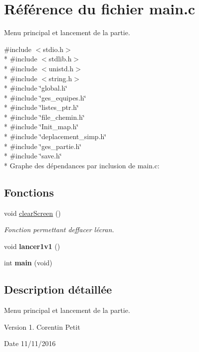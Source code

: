 \hypertarget{a00025}{}\section{Référence du fichier main.\+c}
\label{a00025}


Menu principal et lancement de la partie.  


{\ttfamily \#include $<$stdio.\+h$>$}\\*
{\ttfamily \#include $<$stdlib.\+h$>$}\\*
{\ttfamily \#include $<$unistd.\+h$>$}\\*
{\ttfamily \#include $<$string.\+h$>$}\\*
{\ttfamily \#include \char`\"{}global.\+h\char`\"{}}\\*
{\ttfamily \#include \char`\"{}ges\+\_\+equipes.\+h\char`\"{}}\\*
{\ttfamily \#include \char`\"{}listes\+\_\+ptr.\+h\char`\"{}}\\*
{\ttfamily \#include \char`\"{}file\+\_\+chemin.\+h\char`\"{}}\\*
{\ttfamily \#include \char`\"{}Init\+\_\+map.\+h\char`\"{}}\\*
{\ttfamily \#include \char`\"{}deplacement\+\_\+simp.\+h\char`\"{}}\\*
{\ttfamily \#include \char`\"{}ges\+\_\+partie.\+h\char`\"{}}\\*
{\ttfamily \#include \char`\"{}save.\+h\char`\"{}}\\*
Graphe des dépendances par inclusion de main.\+c\+:
\subsection*{Fonctions}
\begin{DoxyCompactItemize}
\item 
void \hyperlink{a00025_a9d7e8af417b6d543da691e9c0e2f6f9f}{clear\+Screen} ()\hypertarget{a00025_a9d7e8af417b6d543da691e9c0e2f6f9f}{}\label{a00025_a9d7e8af417b6d543da691e9c0e2f6f9f}

\begin{DoxyCompactList}\small\item\em Fonction permettant d\textquotesingle{}effacer l\textquotesingle{}écran. \end{DoxyCompactList}\item 
void {\bfseries lancer1v1} ()\hypertarget{a00025_adb6688570eade5bbce60e9f6e124de44}{}\label{a00025_adb6688570eade5bbce60e9f6e124de44}

\item 
int {\bfseries main} (void)\hypertarget{a00025_a840291bc02cba5474a4cb46a9b9566fe}{}\label{a00025_a840291bc02cba5474a4cb46a9b9566fe}

\end{DoxyCompactItemize}


\subsection{Description détaillée}
Menu principal et lancement de la partie. 

\begin{DoxyVersion}{Version}
1.  Corentin Petit 
\end{DoxyVersion}
\begin{DoxyDate}{Date}
11/11/2016 
\end{DoxyDate}
